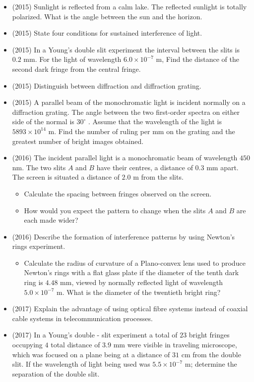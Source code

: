 \documentclass{article}
\begin{document}
\begin{itemize}
\item (2015)  Sunlight is reflected from a calm lake.  The reflected sunlight is totally polarized.  What is the angle between the sun and the horizon.
\item (2015)  State four conditions for sustained interference of light.
\item (2015)  In a Young’s double slit experiment the interval between the slits is $ 0.2$ mm.  For the light of wavelength $ 6.0\times 10^{-7}$ m, Find the distance of the second dark fringe from the central fringe.
\item (2015)  Distinguish between diffraction and diffraction grating.
\item (2015)  A parallel beam of the monochromatic light is incident normally on a diffraction grating.  The angle between the two first-order spectra on either side of the normal is $ 30^{\circ}$ .  Assume that the wavelength of the light is $ 5893\times 10^{14}$ m. Find the number of ruling per mm on the grating and the greatest number of bright images obtained. 
\item (2016)  The incident parallel light is a monochromatic beam of wavelength $ 450$ nm.  The two slits $ A$ and $ B$ have their centres, a distance of $ 0.3$ mm apart.  The screen is situated a distance of $ 2.0$ m from the slits.
 \begin{itemize}
\item Calculate the spacing between fringes observed on the screen.
\item How would you expect the pattern to change when the slits $ A$ and $ B$ are each made wider?
\end{itemize}
\item (2016)  Describe the formation of interference patterns by using Newton’s rings experiment.
 \begin{itemize}
\item Calculate the radius of curvature of a Plano-convex lens used to produce Newton’s rings with a flat glass plate if the diameter of the tenth dark ring is $ 4.48$ mm, viewed by normally reflected light of wavelength $ 5.0 \times 10^{-7}$ m.  What is the diameter of the twentieth bright ring?
\end{itemize}
\item (2017)  Explain the advantage of using optical fibre systems instead of coaxial cable systems in telecommunication processes.
\item (2017)  In a Young's double - slit experiment a total of $ 23$ bright fringes occupying $ 4$ total distance of $ 3.9$ mm were visible in traveling microscope, which was focused on a plane being at a distance of $ 31$ cm from the double slit. If the wavelength of light being used was $ 5.5 \times 10^{-7}$ m; determine the separation of the double slit.

\end{itemize}
\end{document}
